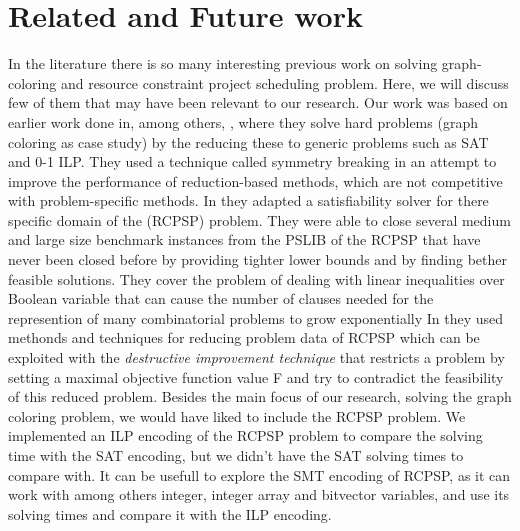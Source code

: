 \documentclass{sig-alternate}
\begin{document}
\section{Related and Future work}
\label{sec:relatedandfuture}
In the literature there is so many interesting previous work on solving graph-coloring and resource constraint project scheduling problem. Here, we will discuss few of them that may have been relevant to our research.
Our work was based on earlier work done in, among others, \cite{ramani2004breaking}, where they solve hard problems (graph coloring as case study) by the reducing these to generic problems such as SAT and 0-1 ILP. They used a technique called symmetry breaking in an attempt to improve the performance of reduction-based methods, which are not competitive with problem-specific methods.
In \cite{horbach2010boolean} they adapted a satisfiability solver for there specific domain of the (RCPSP) problem. They were able to close several medium and large size benchmark instances from the PSLIB of the RCPSP that have never been closed before by providing tighter lower bounds and by finding bether feasible solutions. They cover the problem of dealing with linear inequalities over Boolean variable that can cause the number of clauses needed for the represention of many combinatorial problems to grow exponentially
In \cite{klein1999computing} they used methonds and techniques for reducing problem data of RCPSP which can be exploited with the \emph{destructive improvement technique} that restricts a problem by setting a maximal objective function value F and try to contradict the feasibility of this reduced problem. 
Besides the main focus of our research, solving the graph coloring problem, we would have liked to include
the RCPSP problem.
We implemented an ILP encoding of the RCPSP problem to compare the solving time with the SAT encoding, 
but we didn't have the SAT solving times to compare with. 
It can be usefull to explore the SMT encoding of RCPSP, as it can work with among others integer, 
integer array and bitvector variables, and use its solving times and compare it with the ILP encoding.

\cite{alves2013resource}
\cite{abio2014encoding}
\cite{wu2013exploiting}
\cite{velev2009exploiting}
\cite{horbach2010boolean}
\cite{klein1999computing}
\cite{mingozzi1998exact}
\cite{sharma2011polynomial}
\cite{ramani2004breaking}
\cite{schutt2011explaining}
\cite{wille2008using}
\cite{malaguti2010survey}
\cite{cs395tGCtoSAT}
\end{document}
